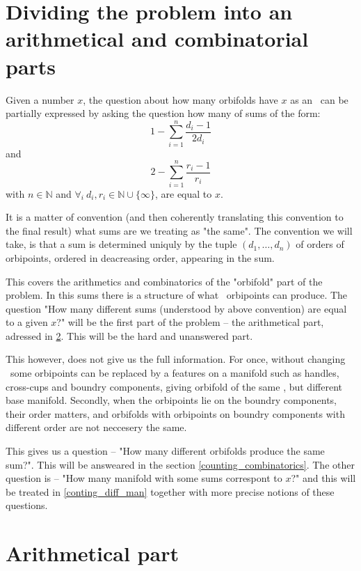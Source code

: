 \section{Dividing the problem into an arithmetical and combinatorial parts}

Given a number $x$, the question about how many orbifolds have $x$ as an \Eoc\ can be 
partially expressed by asking the question how many of sums of the form:
\begin{equation}
1-\sum_{i=1}^n \frac{d_i-1}{2d_i}
\end{equation} 
and
\begin{equation}
2-\sum_{i=1}^n \frac{r_i-1}{r_i}
\end{equation}
with $n\in \mathbb{N}$ and $\forall_i\ d_i,r_i\in\mathbb{N}\cup\{\infty\}$, are equal to $x$. 

It is a matter of convention (and then coherently translating this convention to the final result) 
what sums are we treating as "the same". The convention we will take, is that a sum is determined 
uniquly by the tuple $(d_1,\dots,d_n)$  of orders 
of orbipoints, ordered in deacreasing order, appearing in the sum. 

This covers the arithmetics and combinatorics of the "orbifold" part of the problem. 
In this sums there is a structure of what \Eoc\ orbipoints can produce. 
The question "How many different sums (understood by above convention) are equal to a given $x$?" 
will be the first part of the problem -- the arithmetical part, adressed in 
\ref{conting_arithmetical}. This will be the hard and unanswered part.

This however, does not give us the full information. For once, without changing \Eoc\ some 
orbipoints can be replaced by a features on a manifold such as handles, cross-cups and 
boundry components, giving orbifold of the same \Eoc, but different base manifold. 
Secondly, when the orbipoints lie on the boundry components, their 
order matters, and orbifolds with orbipoints on boundry components with different order 
are not neccesery the same. 

This gives us a question -- "How many different orbifolds produce the same sum?".
This will be answeared in the section \ref{counting_combinatorics}.
The other question is -- "How many manifold with some sums correspont to $x$?" and this will 
be treated in \ref{conting_diff_man} together with more precise notions of these questions. 

\section{Arithmetical part}\label{conting_arithmetical}

